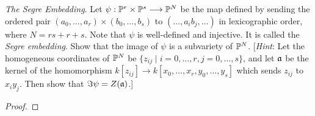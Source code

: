 \label{1.2.14}

\textit{The Segre Embedding}. Let $\psi: \P^r \times \P^s \longrightarrow \P^N$ be the map defined by sending the
ordered pair $(a_0 , \dots, a_r) \times (b_0 , \dots, b_s)$ to $(\dots, a_i b_j, \dots)$ in lexicographic order, where $N = rs + r + s$. Note that $\psi$ is well-defined and injective. It is called the
\textit{Segre embedding}. Show that the image of $\psi$ is a subvariety of $\P^N$. [\textit{Hint}: Let the
homogeneous coordinates of $\P^N$ be $\{z_{ij} \mid i = 0, \dots, r, j = 0, \dots, s\}$, and let $\a$ be the kernel of the homomorphism $k[{z_{ij}}] \longrightarrow k[x_0 , \dots, x_r, y_0 , \dots, y_s]$ which sends $z_{ij}$ to $x_i y_j$. Then show that $\Im \psi = Z(\a)$.]

\begin{proof}
    
\end{proof}